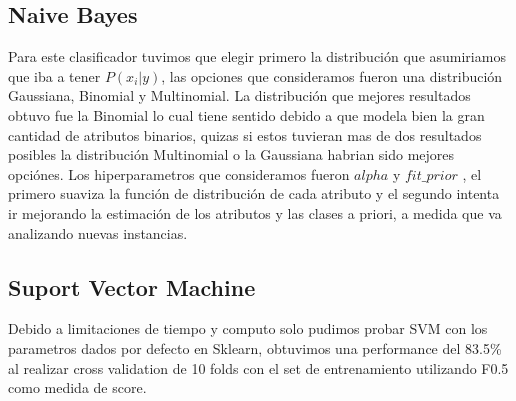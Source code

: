 \begin{enumerate}
\subsection{Naive Bayes}

Para este clasificador tuvimos que elegir primero la distribución que asumiriamos que iba a tener $ P(x_i | y) $, las opciones que consideramos fueron una distribución Gaussiana, Binomial y Multinomial. La distribución que mejores resultados obtuvo fue la Binomial lo cual tiene sentido debido a que modela bien la gran cantidad de atributos binarios, quizas si estos tuvieran mas de dos resultados posibles la distribución Multinomial o la Gaussiana habrian sido mejores opciónes.
Los hiperparametros que consideramos fueron $alpha$ y $fit\_prior$ , el primero suaviza la función de distribución de cada atributo y el segundo intenta ir mejorando la estimación de los atributos y las clases a priori, a medida que va analizando nuevas instancias.


\subsection{Suport Vector Machine}

Debido a limitaciones de tiempo y computo solo pudimos probar SVM con los parametros dados por defecto en Sklearn, obtuvimos una performance del 83.5\% al realizar cross validation de 10 folds con el set de entrenamiento utilizando F0.5 como medida de score.

\end{enumerate}
